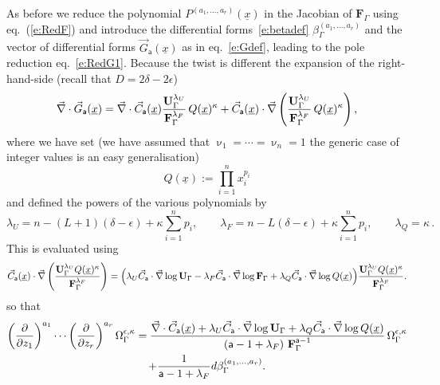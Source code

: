 \documentclass[a4paper,12pt]{article}
\numberwithin{equation}{section}
\numberwithin{figure}{section}
\begin{document}
As before we reduce the  polynomial
$P^{(a_1,\dots,a_r)}(\underline x)$ in the Jacobian of
$\textbf{F}_\Gamma$ using eq.~(\ref{e:RedF}) and introduce the
differential forms~\eqref{e:betadef}
$\beta_\Gamma^{(a_1,\dots,a_r)}$  and the vector of differential forms $\vec
G_{\mathsf{a}}(\underline x)$ as in eq.~\eqref{e:Gdef}, leading to the
pole reduction eq.~\eqref{e:RedG1}.
Because the twist is different the expansion of the 
right-hand-side  (recall that $D=2\delta-2\epsilon$)
\begin{equation}
  \vec\nabla \cdot \vec G_{\mathsf{a}}(\underline x)=  \vec\nabla \cdot \vec C_{\mathsf{a}}(\underline x) { \textbf{U}_\Gamma ^{\lambda_U}  \over \textbf{F}_\Gamma ^{\lambda_F} }\,
  Q(\underline x)^\kappa
+
  \vec C_{\mathsf{a}}(\underline x) \cdot\vec\nabla  \left({ \textbf{U}_\Gamma ^{\lambda_U}  \over \textbf{F}_\Gamma ^{\lambda_F} }\,
  Q(\underline x)^\kappa \right) ,
\end{equation}
where we have set (we have assumed that $\upnu_1=\cdots=\upnu_n=1$ the
generic case of integer values is an easy generalisation)
\begin{equation}
  Q(\underline x):=\prod_{i=1}^n x_i^{p_i}   
\end{equation}
and defined the powers of the various polynomials by
\begin{equation}
  \label{e:powerUFQDef}
  \lambda_U= n-(L+1)(\delta-\epsilon)+\kappa\sum_{i=1}^n p_i, \qquad
  \lambda_F= n-L(\delta-\epsilon)+\kappa\sum_{i=1}^n p_i, \qquad
  \lambda_Q  = \kappa\,.
\end{equation}
%
This is  evaluated using 
\begin{equation}
  \vec C_{\mathsf{a}}(\underline x)\cdot \vec\nabla
  \left(\mathbf{U}_\Gamma^{\lambda_U}Q(\underline x)^\kappa\over
\mathbf{F}_\Gamma^{\lambda_F}\right)=\Big(\lambda_U \vec
C_{\mathsf{a}}\cdot \vec\nabla \log\mathbf{U}_\Gamma -\lambda_F \vec
C_{\mathsf{a}}\cdot \vec\nabla \log \mathbf{F}_\Gamma+\lambda_Q \vec
C_{\mathsf{a}}\cdot\vec\nabla \log Q(\underline                             x)\Big)
                            {\mathbf{U}_\Gamma^{\lambda_U}Q(\underline x)^\kappa\over
\mathbf{F}_\Gamma^{\lambda_F}} .
\end{equation}
so that
\begin{multline}
	\label{e:PredAnReg}
\left(\partial\over \partial z_1\right)^{a_1}\cdots\left(\partial
  \over\partial z_r\right)^{a_r} \Omega_\Gamma^{\epsilon,\kappa}={
\vec\nabla \cdot \vec C_{\mathsf{a}}
     (\underline x)
+  \lambda_U \vec
    C_{\mathsf{a}}\cdot\vec\nabla\log\mathbf{U}_\Gamma+\lambda_Q \vec
    C_{\mathsf{a}}\cdot\vec\nabla\log Q(\underline x)\over
    \left(\mathsf{a}-1+\lambda_F\right)\,\textbf{F}_\Gamma^{\mathsf{a}-1}}\,
  \Omega_\Gamma^{\epsilon,\kappa}\cr
+{  1 \over \mathsf{a}-1+\lambda_F} d\beta_\Gamma^{(a_1,\dots,a_r)}.
\end{multline}
\end{document}

